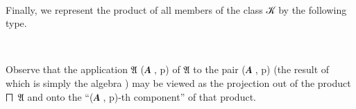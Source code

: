 \ccpad
\begin{code}
\>[0][@{}l@{\AgdaIndent{0}}]%
\>[1]\AgdaSpace{}%
\AgdaSymbol{:}\AgdaSpace{}%
\AgdaSpace{}%
\AgdaSpace{}%
\AgdaSpace{}%
\AgdaSpace{}%
\<%
\\
%
\>[1]\AgdaSpace{}%
\AgdaSymbol{=}\AgdaSpace{}%
\AgdaSpace{}%
\AgdaSymbol{(}\AgdaSpace{}%
\AgdaSymbol{:}\AgdaSpace{}%
\AgdaSymbol{)}\AgdaSpace{}%
\AgdaSpace{}%
\AgdaSpace{}%
\AgdaSpace{}%
\<%
\end{code}
\ccpad
Finally, we represent the product of all members of the class \ab 𝒦 by the following type.
\ccpad
\begin{code}%
\>[0][@{}l@{\AgdaIndent{0}}]%
\>[1]\AgdaSpace{}%
\AgdaSymbol{:}\AgdaSpace{}%
\AgdaSpace{}%
\AgdaSymbol{(}\AgdaSpace{}%
\AgdaSymbol{)}\AgdaSpace{}%
\<%
\\
%
\>[1]\AgdaSpace{}%
\AgdaSymbol{=}\AgdaSpace{}%
\AgdaSpace{}%
\<%
\end{code}
\ccpad
Observe that the application \af 𝔄 (\ab 𝑨 , \ab p) of \af 𝔄 to the pair (\ab 𝑨 , \ab p) (the result of which is simply the algebra ) may be viewed as the projection out of the product \af ⨅~\af 𝔄 and onto the ``(\ab 𝑨 , \ab p)-th component'' of that product.

